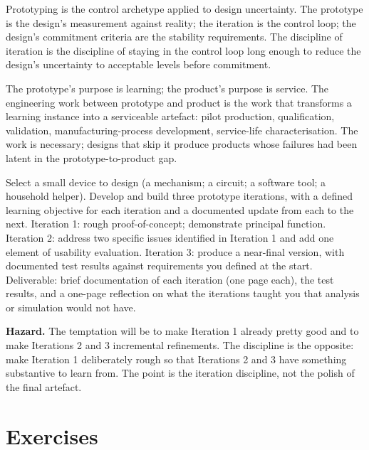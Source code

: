 \begin{archetype}[control]
Prototyping is the control archetype applied to design uncertainty. The prototype is the design's measurement against reality; the iteration is the control loop; the design's commitment criteria are the stability requirements. The discipline of iteration is the discipline of staying in the control loop long enough to reduce the design's uncertainty to acceptable levels before commitment.
\end{archetype}

\begin{principle}
The prototype's purpose is learning; the product's purpose is service. The engineering work between prototype and product is the work that transforms a learning instance into a serviceable artefact: pilot production, qualification, validation, manufacturing-process development, service-life characterisation. The work is necessary; designs that skip it produce products whose failures had been latent in the prototype-to-product gap.
\end{principle}

\begin{project}
Select a small device to design (a mechanism; a circuit; a software tool; a household helper). Develop and build three prototype iterations, with a defined learning objective for each iteration and a documented update from each to the next. Iteration 1: rough proof-of-concept; demonstrate principal function. Iteration 2: address two specific issues identified in Iteration 1 and add one element of usability evaluation. Iteration 3: produce a near-final version, with documented test results against requirements you defined at the start. Deliverable: brief documentation of each iteration (one page each), the test results, and a one-page reflection on what the iterations taught you that analysis or simulation would not have.

\textbf{Hazard.} The temptation will be to make Iteration 1 already pretty good and to make Iterations 2 and 3 incremental refinements. The discipline is the opposite: make Iteration 1 deliberately rough so that Iterations 2 and 3 have something substantive to learn from. The point is the iteration discipline, not the polish of the final artefact.
\end{project}

\section{Exercises}

